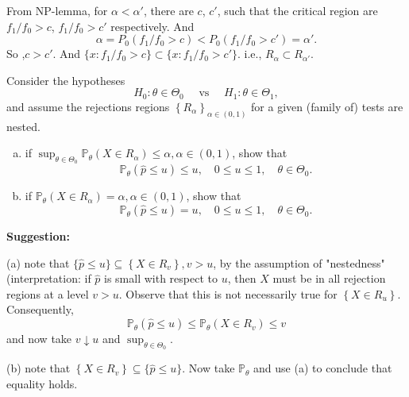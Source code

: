 \begin{solution}
    From NP-lemma, for  $\alpha<\alpha'$, there are $c$, $c'$, such that the critical region are $f_1/f_0>c$, $f_1/f_0>c'$ respectively. And 
    \[
        \alpha=P_0(f_1/f_0>c)<P_0(f_1/f_0>c')=\alpha'. 
    \]
    So ,$c>c'$. And $\{x:f_1/f_0>c\}\subset\{x:f_1/f_0>c'\}$. i.e., $R_\alpha\subset R_{\alpha'}$. 
\end{solution}

\begin{ex}
    Consider the hypotheses
    \[
        H_{0}: \theta \in \Theta_{0} \quad \text { vs } \quad H_{1}: \theta \in \Theta_{1}, 
    \]
    and assume the rejections regions \(\left\{R_{\alpha}\right\}_{\alpha \in(0,1)}\) for a given (family of) tests are nested. 
    \begin{enumerate}[(a)]
        \item if \(\sup _{\theta \in \Theta_{0}} \mathbb{P}_{\theta}\left(X \in R_{\alpha}\right) \leq \alpha, \alpha \in(0,1)\), show that
        \[
            \mathbb{P}_{\theta}(\widehat{p} \leq u) \leq u, \quad 0 \leq u \leq 1, \quad \theta \in \Theta_{0}. 
        \]
        \item if \(\mathbb{P}_{\theta}\left(X \in R_{\alpha}\right)=\alpha, \alpha \in(0,1)\), show that
        \[
            \mathbb{P}_{\theta}(\widehat{p} \leq u)=u, \quad 0 \leq u \leq 1, \quad \theta \in \Theta_{0}. 
        \]
    \end{enumerate}
    {\bfseries Suggestion: }

    (a) note that \(\{\widehat{p} \leq u\} \subseteq\left\{X \in R_{v}\right\}, v>u\), by the assumption of "nestedness" (interpretation: if \(\widehat{p}\) is small with respect to \(u\), then \(X\) must be in all rejection regions at a level \(v>u\). Observe that this is not necessarily true for \(\left\{X \in R_{u}\right\}\). Consequently,
    \[
    \mathbb{P}_{\theta}(\widehat{p} \leq u) \leq \mathbb{P}_{\theta}\left(X \in R_{v}\right) \leq v
    \]
    and now take \(v \downarrow u\) and \(\sup _{\theta \in \Theta_{0}}\). 

    (b) note that \(\left\{X \in R_{v}\right\} \subseteq\{\widehat{p} \leq u\}\). Now take \(\mathbb{P}_{\theta}\) and use (a) to conclude that equality holds. 
\end{ex}


